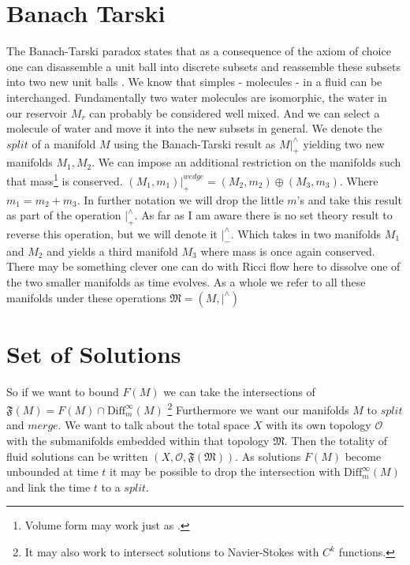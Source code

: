 \documentclass[10pt, oneside]{article}
\newcommand{\F}{\mathfrak{F}}
\begin{document}
\section*{Banach Tarski}
   The Banach-Tarski paradox states that as a consequence of the axiom of choice one can disassemble a unit ball into discrete subsets and reassemble these subsets into two new unit balls \cite{Tao2011}. We know that simples - molecules - in a fluid can be interchanged. Fundamentally two water molecules are isomorphic, the water in our reservoir $M_r$ can probably be considered well mixed. And we can select a molecule of water and move it into the new subsets in general.
   We denote the $split$ of a manifold $M$ using the Banach-Tarski result as $M|^\wedge_+$ yielding two new manifolds $M_1, M_2$. We can impose an additional restriction on the manifolds such that mass\footnote{Volume form may work just as .} is conserved. $(M_1,m_1)|^{wedge}_+ = (M_2,m_2) \oplus (M_3,m_3)$. Where $m_1 = m_2 + m_3$. In further notation we will drop the little $m$'s and take this result as part of the operation $|^\wedge_+$.
   As far as I am aware there is no set theory result to reverse this operation, but we will denote it $|^\wedge_-$. Which takes in two manifolds $M_1$ and $M_2$ and yields a third manifold $M_3$ where mass is once again conserved.
   There may be something clever one can do with Ricci flow here to dissolve one of the two smaller manifolds as time evolves.\cite{gianniotis2015ricciflowmanifoldsboundary} As a whole we refer to all these manifolds under these operations $\mathfrak{M} = (M, |^\wedge)$
\section*{Set of Solutions}
   So if we want to bound $F(M)$ we can take the intersections of $\F(M) = F(M) \cap \text{Diff}_m^\infty(M)$ \footnote{It may also work to intersect solutions to Navier-Stokes with $C^k$ functions.} Furthermore we want our manifolds $M$ to $split$ and $merge$. We want to talk about the total space $X$ with its own topology $\mathcal{O}$ with the submanifolds embedded within that topology $\mathfrak{M}$.
   Then the totality of fluid solutions can be written $(X,\mathcal{O},\F(\mathfrak{M}))$. As solutions $F(M)$ become unbounded at time $t$ it may be possible to drop the intersection with $\text{Diff}_m^\infty (M)$ and link the time $t$ to a $split$.
\end{document}
